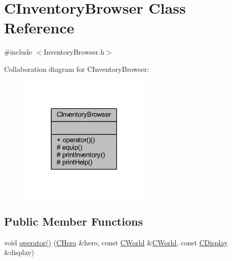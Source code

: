 \hypertarget{class_c_inventory_browser}{}\section{C\+Inventory\+Browser Class Reference}
\label{class_c_inventory_browser}


{\ttfamily \#include $<$Inventory\+Browser.\+h$>$}



Collaboration diagram for C\+Inventory\+Browser\+:\nopagebreak
\begin{figure}[H]
\begin{center}
\leavevmode
\includegraphics[width=177pt]{class_c_inventory_browser__coll__graph}
\end{center}
\end{figure}
\subsection*{Public Member Functions}
\begin{DoxyCompactItemize}
\item 
void \mbox{\hyperlink{class_c_inventory_browser_a91c51766048ba5629b125b9a444d31bb}{operator()}} (\mbox{\hyperlink{class_c_hero}{C\+Hero}} \&hero, const \mbox{\hyperlink{class_c_world}{C\+World}} \&\mbox{\hyperlink{class_c_world}{C\+World}}, const \mbox{\hyperlink{class_c_display}{C\+Display}} \&display)
\end{DoxyCompactItemize}

